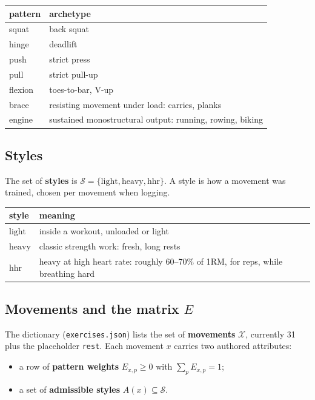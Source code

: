 \documentclass[11pt]{article}
\theoremstyle{plain}
\theoremstyle{definition}
\newcommand{\code}[1]{\texttt{#1}}
\newcommand{\Sty}{\mathcal{S}}
\newcommand{\Mov}{\mathcal{X}}
\newcommand{\light}{\mathrm{light}}
\newcommand{\heavy}{\mathrm{heavy}}
\newcommand{\hhr}{\mathrm{hhr}}
\begin{document}
\begin{center}
\begin{tabular}{ll}
\toprule
pattern & archetype \\
\midrule
squat   & back squat \\
hinge   & deadlift \\
push    & strict press \\
pull    & strict pull-up \\
flexion & toes-to-bar, V-up \\
brace   & resisting movement under load: carries, planks \\
engine  & sustained monostructural output: running, rowing, biking \\
\bottomrule
\end{tabular}
\end{center}

\subsection{Styles}

The set of \textbf{styles} is $\Sty = \{\light, \heavy, \hhr\}$. A style
is how a movement was trained, chosen per movement when logging.

\begin{center}
\begin{tabular}{lp{}}
\toprule
style & meaning \\
\midrule
$\light$ & inside a workout, unloaded or light \\
$\heavy$ & classic strength work: fresh, long rests \\
$\hhr$   & heavy at high heart rate: roughly 60--70\% of 1RM, for reps,
           while breathing hard \\
\bottomrule
\end{tabular}
\end{center}

\subsection{\texorpdfstring{Movements and the matrix $E$}{Movements and the matrix E}}\label{sec:E}

The dictionary (\code{exercises.json}) lists the set of
\textbf{movements} $\Mov$, currently 31 plus the placeholder \code{rest}.
Each movement $x$ carries two authored attributes:

\begin{itemize}[nosep]
\item a row of \textbf{pattern weights} $E_{x,p} \ge 0$ with
  $\sum_{p} E_{x,p} = 1$;
\item a set of \textbf{admissible styles} $A(x) \subseteq \Sty$.
\end{itemize}
\end{document}
